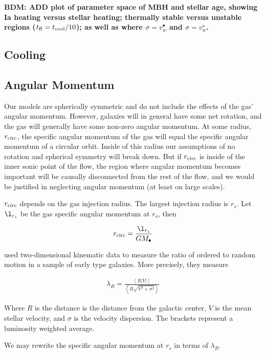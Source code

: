 \documentclass[usenatbib,fleqn]{mn2e}
\newcommand{\rs}{r_s}
\newcommand{\rcirc}{r_{\rm circ}}
\newcommand{\lrs}{\l_{\rs}}
\newcommand{\Mbh}[1][]{M_{\bullet#1}}
\begin{document}
{\bf BDM: ADD plot of parameter space of MBH and stellar age, showing Ia heating versus stellar heating; thermally stable versus unstable regions ($t_{\rm ff} = t_{\rm cool}/10$); as well as where $\sigma = v_{w}^{\bullet}$ and $\sigma = v_{w}^{\star}$.  }

\subsection{Cooling}
\label{sec:cooling}

  \subsection{Angular Momentum}
  \label{sec:ang}
  Our models are spherically symmetric and do not include the effects of
  the gas' angular momentum. However, galaxies will in general have some
  net rotation, and the gas will generally have some non-zero angular
  momentum. At some radius, $\rcirc$, the specific angular momentum of
  the gas will equal the specific angular momentum of a circular
  orbit. Inside of this radius our assumptions of no rotation and
  spherical symmetry will break down. But if $\rcirc$ is inside of the
  inner sonic point of the flow, the region where angular momentum
  becomes important will be causally disconnected from the rest of the
  flow, and we would be justified in neglecting angular momentum (at
  least on large scales).

  $\rcirc$ depends on the gas injection radius. The largest
  injection radius is $\rs$. Let $\lrs$ be the gas specific angular
  momentum at $\rs$, then 

  \begin{align}
    \rcirc=\frac{\lrs}{G \Mbh}
  \end{align}

  \citet{EmsellemCappellari+:2007a} used two-dimensional kinematic
  data to measure the ratio of ordered to random motion in a sample of
  early type galaxies. More precisely, they measure

  \begin{align}
    \lambda_R=\frac{\left<R|V|\right>}{\left<R\sqrt{V^2+\sigma^2}\right>}
  \end{align}

  Where $R$ is the distance is the distance from the galactic center, $V$ is
  the mean stellar velocity, and $\sigma$ is the velocity
  dispersion. The brackets represent a luminosity weighted average.

  We may rewrite the specific angular momentum at $\rs$ in terms of
  $\lambda_R$.
\end{document}
